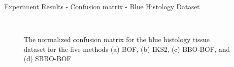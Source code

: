 \documentclass [9pt,times] {beamer}
\begin{document}
\begin{frame}{Experiment Results - Confusion matrix - Blue Histology Dataset}
\scriptsize
\begin{figure}
\centering
                      \\
        
  \caption{The normalized confusion matrix for the blue histology tissue dataset for the five methods (a) BOF, (b) IKS2, (c) BBO-BOF, and (d) SBBO-BOF}
\label{fig:cm_tissue}
\end{figure}
\end{frame}



\end{document}

